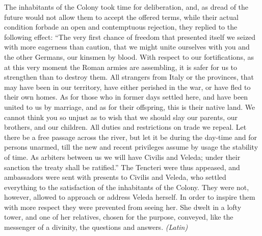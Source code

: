 The inhabitants of the Colony took time for deliberation, and, as dread of the future would not allow them to accept the offered terms, while their actual condition forbade an open and contemptuous rejection, they replied to the following effect: ``The very first chance of freedom that presented itself we seized with more eagerness than caution, that we might unite ourselves with you and the other Germans, our kinsmen by blood. With respect to our fortifications, as at this very moment the Roman armies are assembling, it is safer for us to strengthen than to destroy them. All strangers from Italy or the provinces, that may have been in our territory, have either perished in the war, or have fled to their own homes. As for those who in former days settled here, and have been united to us by marriage, and as for their offspring, this is their native land. We cannot think you so unjust as to wish that we should slay our parents, our brothers, and our children. All duties and restrictions on trade we repeal. Let there be a free passage across the river, but let it be during the day-time and for persons unarmed, till the new and recent privileges assume by usage the stability of time. As arbiters between us we will have Civilis and Veleda; under their sanction the treaty shall be ratified.'' The Tencteri were thus appeased, and ambassadors were sent with presents to Civilis and Veleda, who settled everything to the satisfaction of the inhabitants of the Colony. They were not, however, allowed to approach or address Veleda herself. In order to inspire them with more respect they were prevented from seeing her. She dwelt in a lofty tower, and one of her relatives, chosen for the purpose, conveyed, like the messenger of a divinity, the questions and answers. \emph{(Latin)}


